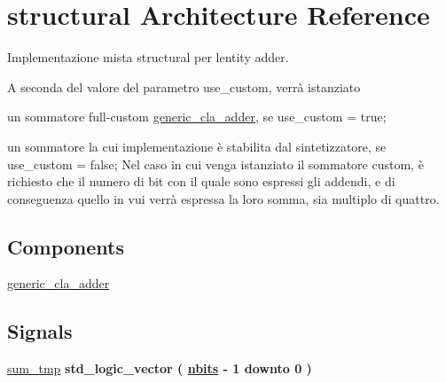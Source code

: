\hypertarget{classadder_1_1structural}{}\section{structural Architecture Reference}
\label{classadder_1_1structural}


Implementazione mista structural per l\textquotesingle{}entity adder.

A seconda del valore del parametro use\+\_\+custom, verrà istanziato
\begin{DoxyItemize}
\item un sommatore full-\/custom \hyperlink{classgeneric__cla__adder}{generic\+\_\+cla\+\_\+adder}, se use\+\_\+custom = true;
\item un sommatore la cui implementazione è stabilita dal sintetizzatore, se use\+\_\+custom = false; Nel caso in cui venga istanziato il sommatore custom, è richiesto che il numero di bit con il quale sono espressi gli addendi, e di conseguenza quello in vui verrà espressa la loro somma, sia multiplo di quattro. 
\end{DoxyItemize} 


\subsection*{Components}
 \begin{DoxyCompactItemize}
\item 
\hyperlink{group___adder_gae7148956d4ef1d1cd14f35060634b9c3}{generic\+\_\+cla\+\_\+adder}  {\bfseries }  
\end{DoxyCompactItemize}
\subsection*{Signals}
 \begin{DoxyCompactItemize}
\item 
\hyperlink{group___adder_ga590914af948ec283f1371002f2f76720}{sum\+\_\+tmp} {\bfseries \textcolor{vhdlchar}{std\+\_\+logic\+\_\+vector}\textcolor{vhdlchar}{ }\textcolor{vhdlchar}{(}\textcolor{vhdlchar}{ }\textcolor{vhdlchar}{ }\textcolor{vhdlchar}{ }\textcolor{vhdlchar}{ }{\bfseries \hyperlink{group___adder_gae1435c07d0cd54b521535e2f8de6f94e}{nbits}} \textcolor{vhdlchar}{-\/}\textcolor{vhdlchar}{ } \textcolor{vhdldigit}{1} \textcolor{vhdlchar}{ }\textcolor{vhdlchar}{downto}\textcolor{vhdlchar}{ }\textcolor{vhdlchar}{ } \textcolor{vhdldigit}{0} \textcolor{vhdlchar}{ }\textcolor{vhdlchar}{)}\textcolor{vhdlchar}{ }} 
\end{DoxyCompactItemize}
